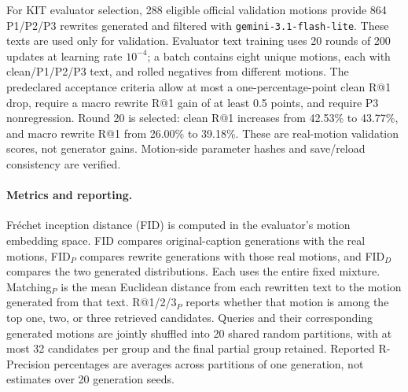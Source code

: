 For KIT evaluator selection, 288 eligible official validation motions provide
864 P1/P2/P3 rewrites generated and filtered with \texttt{gemini-3.1-flash-lite}.
These texts are used only for validation. Evaluator text training uses 20
rounds of 200 updates at learning rate $10^{-4}$; a batch contains eight
unique motions, each with clean/P1/P2/P3 text, and rolled negatives from
different motions. The predeclared acceptance criteria allow at most a
one-percentage-point clean R@1 drop, require a macro rewrite R@1 gain of at
least 0.5 points, and require P3 nonregression. Round 20 is selected: clean
R@1 increases from 42.53\% to 43.77\%, and macro rewrite R@1 from 26.00\%
to 39.18\%. These are real-motion validation scores, not generator gains.
Motion-side parameter hashes and save/reload consistency are verified.

\begin{table}[t]
\centering
\caption{HumanML3D on 4,380 fixed prompt pairs, CFG=1.3. FID variants use source encoders; other columns use adapted encoders and separate generations. Retrieval (\%) averages 20 candidate partitions of one generation seed. Bold marks the within-family best; diversity is closest to the real reference (9.137).}
\label{tab:humanml_methods}
\resulttablesetup

\end{table}

\paragraph{Metrics and reporting.}
Fr\'echet inception distance (FID) is computed in the evaluator's motion
embedding space. FID compares original-caption generations with the real
motions, FID$_P$ compares rewrite generations with those real motions, and
FID$_D$ compares the two generated distributions. Each uses the entire fixed
mixture. Matching$_P$ is the mean Euclidean distance from each rewritten text
to the motion generated from that text. R@1/2/3$_P$ reports whether that motion
is among the top one, two, or three retrieved candidates. Queries and their
corresponding generated motions are jointly shuffled into 20 shared random
partitions, with at most 32 candidates per group and the final partial group
retained. Reported R-Precision percentages are averages across partitions of
one generation, not estimates over 20 generation seeds.

